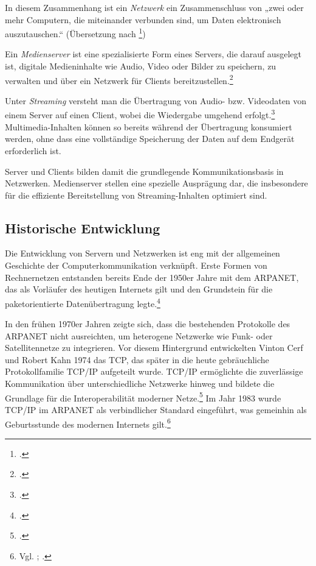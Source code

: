 \documentclass[12pt,a4paper]{report}
\begin{document}
  In diesem Zusammenhang ist ein \emph{Netzwerk} ein Zusammenschluss von „zwei oder mehr Computern,
  die miteinander verbunden sind, um Daten elektronisch auszutauschen.“
  (Übersetzung nach \footcite{britannica_network})

  Ein \emph{Medienserver} ist eine spezialisierte Form eines Servers, 
  die darauf ausgelegt ist, digitale Medieninhalte wie Audio, Video oder Bilder zu speichern, 
  zu verwalten und über ein Netzwerk für Clients bereitzustellen.\footcite[Vgl.][S.~131 ~ff.]{steinmetz_multimedia}

  Unter \emph{Streaming} versteht man die Übertragung von Audio- bzw. Videodaten von einem Server auf einen Client, 
  wobei die Wiedergabe umgehend erfolgt.\footcite{gabler_streaming}
  Multimedia-Inhalten können so bereits während der Übertragung konsumiert werden, 
  ohne dass eine vollständige Speicherung der Daten auf dem Endgerät erforderlich ist.

  Server und Clients bilden damit die grundlegende Kommunikationsbasis in Netzwerken. 
  Medienserver stellen eine spezielle Ausprägung dar, 
  die insbesondere für die effiziente Bereitstellung von Streaming-Inhalten optimiert sind.

  \subsection{Historische Entwicklung}
  Die Entwicklung von Servern und Netzwerken ist eng mit der allgemeinen Geschichte der Computerkommunikation verknüpft. 
  Erste Formen von Rechnernetzen entstanden bereits Ende der 1950er Jahre mit dem \ac{ARPANET}, 
  das als Vorläufer des heutigen Internets gilt 
  und den Grundstein für die paketorientierte Datenübertragung legte.\footcite[Vgl.][S.~45~f.]{tanenbaum_computernetworks}

  In den frühen 1970er Jahren zeigte sich, dass die bestehenden Protokolle des \ac{ARPANET} nicht ausreichten, 
  um heterogene Netzwerke wie Funk- oder Satellitennetze zu integrieren. 
  Vor diesem Hintergrund entwickelten Vinton Cerf und Robert Kahn 1974 das \ac{TCP}, 
  das später in die heute gebräuchliche Protokollfamilie \ac{TCP}/\ac{IP} aufgeteilt wurde. 
  \ac{TCP}/\ac{IP} ermöglichte die zuverlässige Kommunikation über unterschiedliche Netzwerke hinweg 
  und bildete die Grundlage für die Interoperabilität moderner Netze.\footcite[Vgl.][S.~45]{tanenbaum_computernetworks}
  Im Jahr 1983 wurde \ac{TCP}/\ac{IP} im \ac{ARPANET} als verbindlicher Standard eingeführt,
  was gemeinhin als Geburtsstunde des modernen Internets gilt.\footnote{Vgl. \cite[S.~2]{postel_rfc801}; \cite{britannica_tcpip}.}
\end{document}
